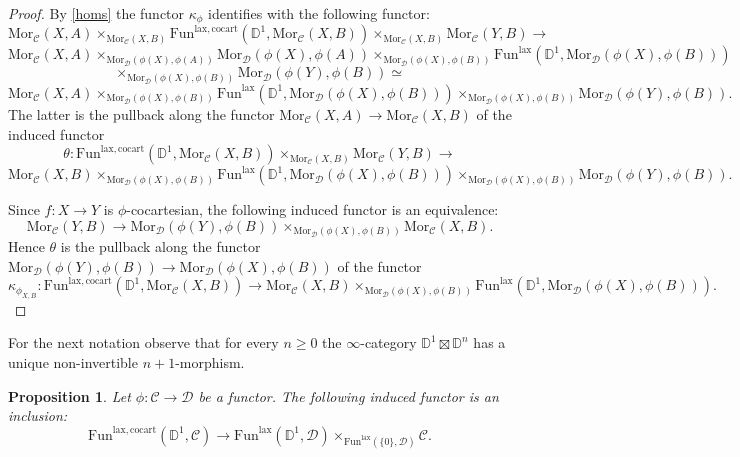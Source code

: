 \documentclass[10pt,oneside]{article}
\numberwithin{equation}{section} %
\numberwithin{figure}{section} %
\theoremstyle{plain}
\newtheorem{proposition}[theorem]{Proposition}
\theoremstyle{definition}
\newcommand{\bD}{{\mathbb D}}
\newcommand{\mC}{{\mathcal C}}
\newcommand{\mD}{{\mathcal D}}
\newcommand{\Fun}{\mathrm{Fun}}
\newcommand{\cocart}{{\mathrm{cocart}}}
\newcommand{\lax}{{\mathrm{lax}}}
\newcommand{\Mor}{{\mathrm{Mor}}}
\begin{document}
\begin{proof}
By \cref{homs} the functor $\kappa_\phi $
identifies with the following functor:
$$\Mor_\mC(X,A) \times_{\Mor_\mC(X,B)} \Fun^{\lax,\cocart}(\bD^1,\Mor_\mC(X,B)) \times_{\Mor_\mC(X,B)} \Mor_\mC(Y,B) \to $$$$ \Mor_\mC(X,A) \times_{\Mor_\mD(\phi(X),\phi(A))} \Mor_\mD(\phi(X),\phi(A)) \times_{\Mor_\mD(\phi(X),\phi(B))} \Fun^\lax(\bD^1,\Mor_\mD(\phi(X),\phi(B))) $$$$\times_{\Mor_\mD(\phi(X),\phi(B))} \Mor_\mD(\phi(Y),\phi(B)) \simeq $$
$$\Mor_\mC(X,A) \times_{\Mor_\mD(\phi(X),\phi(B))} \Fun^\lax(\bD^1,\Mor_\mD(\phi(X),\phi(B))) \times_{\Mor_\mD(\phi(X),\phi(B))} \Mor_\mD(\phi(Y),\phi(B)). $$
The latter is the pullback along the functor
$ \Mor_\mC(X,A) \to \Mor_\mC(X,B) $ of the induced functor
$$ \theta: \Fun^{\lax,\cocart}(\bD^1,\Mor_\mC(X,B)) \times_{\Mor_\mC(X,B)} \Mor_\mC(Y,B) \to $$$$ \Mor_\mC(X,B ) \times_{\Mor_\mD(\phi(X),\phi(B))} \Fun^\lax(\bD^1,\Mor_\mD(\phi(X),\phi(B))) \times_{\Mor_\mD(\phi(X),\phi(B))} \Mor_\mD(\phi(Y),\phi(B)). $$



Since $f: X \to Y $ is $\phi$-cocartesian, the following induced functor
is an equivalence: $$\Mor_\mC(Y,B) \to \Mor_\mD(\phi(Y),\phi(B)) \times_{\Mor_\mD(\phi(X),\phi(B))} \Mor_\mC(X,B).$$
Hence $\theta$ is the pullback along the functor
$\Mor_\mD(\phi(Y),\phi(B)) \to \Mor_\mD(\phi(X),\phi(B)) $ of the functor
$$ \kappa_{\phi_{X,B}}: \Fun^{\lax, \cocart}(\bD^1,\Mor_\mC(X,B)) \to \Mor_\mC(X,B ) \times_{\Mor_\mD(\phi(X),\phi(B))} \Fun^\lax(\bD^1,\Mor_\mD(\phi(X),\phi(B))). $$
\end{proof}

For the next notation observe that for every $n \geq 0$ the $\infty$-category $\bD^1 \boxtimes \bD^n $ has a unique non-invertible $n+1$-morphism.



\begin{proposition}\label{laxcocar}
Let $\phi: \mC \to \mD$ be a functor. The following induced functor is an inclusion: $$\Fun^{\lax, \cocart}(\bD^1,\mC) \to \Fun^\lax(\bD^1,\mD) \times_{\Fun^\lax(\{0\},\mD)} \mC.$$ 
    
\end{proposition}
\end{document}
